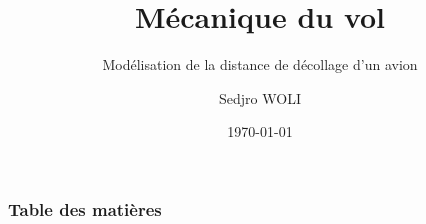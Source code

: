 \documentclass{beamer}
\title{Mécanique du vol}
\subtitle{Modélisation de la distance de décollage d'un avion}
\author{Sedjro WOLI}
\date{\today}
\begin{document}
	
	\begin{frame}
		\titlepage
	\end{frame}
	
	\begin{frame}
		\frametitle{Table des matières}
		\tableofcontents
	\end{frame}
	

	
	
	
	
	
	
	
	
	
	

	
\end{document}
